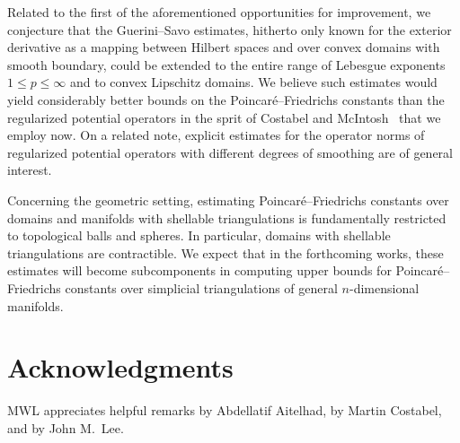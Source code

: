 \documentclass[10pt,letterpaper]{article}
\begin{document}
Related to the first of the aforementioned opportunities for improvement, we conjecture that the Guerini--Savo estimates, hitherto only known for the exterior derivative as a mapping between Hilbert spaces and over convex domains with smooth boundary, could be extended to the entire range of Lebesgue exponents $1 \leq p \leq \infty$ and to convex Lipschitz domains. We believe such estimates would yield considerably better bounds on the Poincar\'e--Friedrichs constants than the regularized potential operators in the sprit of Costabel and McIntosh~\cite{costabel2010bogovskiui} that we employ now. 
On a related note, explicit estimates for the operator norms of regularized potential operators with different degrees of smoothing are of general interest. 

Concerning the geometric setting, estimating Poincar\'e--Friedrichs constants over domains and manifolds with shellable triangulations is fundamentally restricted to topological balls and spheres. In particular, domains with shellable triangulations are contractible. We expect that in the forthcoming works, these estimates will become subcomponents in computing upper bounds for Poincar\'e--Friedrichs constants over simplicial triangulations of general $n$-dimensional manifolds. 




\section*{Acknowledgments}

MWL appreciates helpful remarks by Abdellatif Aitelhad, by Martin Costabel, and by John M.\ Lee.



\end{document}
